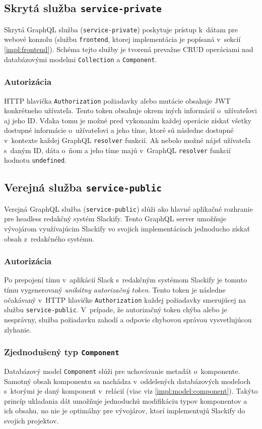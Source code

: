 \subsection{Skrytá služba \texttt{service-private}}
\label{impl:service-private}
Skrytá GraphQL služba (\texttt{service-private}) poskytuje prístup k~dátam pre webové konzolu (službu \texttt{frontend}, ktorej implementácia je popísaná v~sekcií \ref{impl:frontend}). Schéma tejto služby je tvorená prevažne CRUD operáciami nad databázovými modelmi \texttt{Collection} a \texttt{Component}.

\subsubsection{Autorizácia}
HTTP hlavička \texttt{Authorization} požiadavky alebo mutácie obsahuje JWT konkrétneho užívateľa. Tento token obsahuje okrem iných informácií o~užívateľovi aj jeho ID. Vďaka tomu je možné pred vykonaním každej operácie získať všetky dostupné informácie o~užívateľovi a jeho tíme, ktoré sú následne dostupné v~kontexte každej GraphQL \texttt{resolver} funkcií. Ak nebolo možné nájsť užívateľa s~daným ID, dáta o~ňom a jeho tíme majú v~GraphQL \texttt{resolver} funkcií hodnotu \texttt{undefined}.

\subsection{Verejná služba \texttt{service-public}}
\label{impl:service-public}
Verejná GraphQL služba (\texttt{service-public}) slúži ako hlavné aplikačné rozhranie pre headless redakčný systém Slackify. Tento GraphQL server umožňuje vývojárom využívajúcim Slackify vo svojich implementáciach jednoducho získať obsah z~redakčného systému.

\subsubsection{Autorizácia}
Po prepojení tímu v~aplikácií Slack s~redakčným systémom Slackify je tomuto tímu vygenerovaný \emph{unikátny autorizačný token}. Tento token je následne očakávaný v~HTTP hlavičke \texttt{Authorization} každej požiadavky smerujúcej na službu \texttt{service-public}. V~prípade, že autorizačný token chýba alebo je nesprávny, služba požiadavku zahodí a odpovie chybovou správou vysvetlujúcou zlyhanie. 

\subsubsection{Zjednodušený typ \texttt{Component}}
Databázový model \texttt{Component} slúži pre uchovávanie metadát o~komponente. Samotný obsah komponentu sa nachádza v~oddelených databázových modeloch s~ktorými je daný komponent v~relácií (viac viz \ref{impl:model:component}). Takýto princíp ukladania dát umožňuje jednoduchú modifikáciu typov komponentov a ich obsahu, no nie je optimálny pre vývojárov, ktorí implementujú Slackify do svojich projektov. \\

